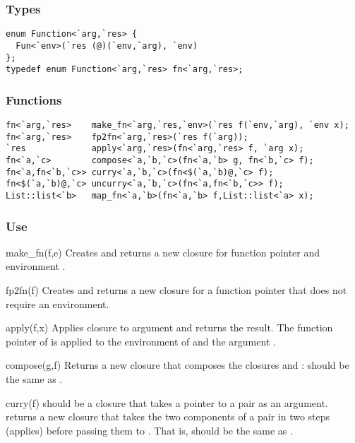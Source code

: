 \subsubsection*{Types}
\begin{verbatim}
enum Function<`arg,`res> {
  Fun<`env>(`res (@)(`env,`arg), `env)
};
typedef enum Function<`arg,`res> fn<`arg,`res>;
\end{verbatim}

\subsubsection*{Functions}
\begin{verbatim}
fn<`arg,`res>    make_fn<`arg,`res,`env>(`res f(`env,`arg), `env x);
fn<`arg,`res>    fp2fn<`arg,`res>(`res f(`arg));
`res             apply<`arg,`res>(fn<`arg,`res> f, `arg x);
fn<`a,`c>        compose<`a,`b,`c>(fn<`a,`b> g, fn<`b,`c> f);
fn<`a,fn<`b,`c>> curry<`a,`b,`c>(fn<$(`a,`b)@,`c> f);
fn<$(`a,`b)@,`c> uncurry<`a,`b,`c>(fn<`a,fn<`b,`c>> f);
List::list<`b>   map_fn<`a,`b>(fn<`a,`b> f,List::list<`a> x);
\end{verbatim}

\subsubsection*{Use}
\begin{defun}{make_fn}{(f,e)}
Creates and returns a new closure for function pointer  and environment
.
\end{defun}

\begin{defun}{fp2fn}{(f)}
Creates and returns a new closure for a function pointer that does not
require an environment.
\end{defun}

\begin{defun}{apply}{(f,x)}
Applies closure  to argument  and returns the result.  The
function pointer of  is applied to the environment of  and
the argument .
\end{defun}

\begin{defun}{compose}{(g,f)}
Returns a new closure that composes the closures  and :
 should be the same as
.
\end{defun}

\begin{defun}{curry}{(f)}
 should be a closure that takes a pointer to a pair as an
argument.   returns a new closure that takes the
two components of a pair in two steps (applies) before passing them to
.  That is,  should be
the same as .
\end{defun}

